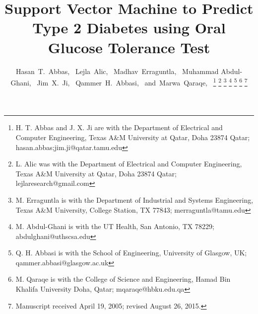 \documentclass[journal,comsoc]{IEEEtran}
\renewcommand{\^}{\hat}  %
\begin{document}
%
\title{Support Vector Machine to Predict Type 2 Diabetes using Oral Glucose Tolerance Test}
%
%

\author{Hasan~T.~Abbas,~
Lejla~Alic,~
Madhav~Erraguntla,~
Muhammad Abdul-Ghani,~
Jim~X.~Ji,~
Qammer~H.~Abbasi,~
and~Marwa~Qaraqe,~%
\thanks{H. T. Abbas and J. X. Ji are with the Department
of Electrical and Computer Engineering, Texas A\&M University at Qatar, Doha 23874 Qatar;  {hasan.abbas;jim.ji}@qatar.tamu.edu}%
\thanks{L. Alic was with the Department
of Electrical and Computer Engineering, Texas A\&M University at Qatar, Doha 23874 Qatar; lejlaresearch@gmail.com}%
\thanks{M. Erraguntla is with the Department of Industrial and Systems Engineering, Texas A\&M University, College Station, TX 77843; merraguntla@tamu.edu}%
\thanks{M. Abdul-Ghani is with the UT Health, San Antonio, TX 78229; abdulghani@uthscsa.edu}%
\thanks{Q. H. Abbasi is with the School of Engineering, University of Glasgow, UK; qammer.abbasi@glasgow.ac.uk}%
\thanks{M. Qaraqe is with the College of Science and Engineering, Hamad Bin Khalifa University Doha, Qatar; mqaraqe@hbku.edu.qa}%
\thanks{Manuscript received April 19, 2005; revised August 26, 2015.}}

%
%
\end{document}
